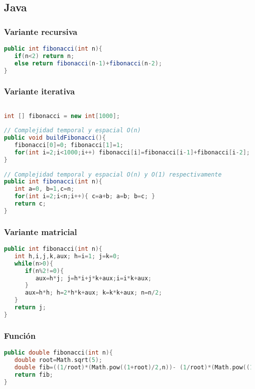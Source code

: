 \subsection{Java}

\subsubsection{Variante recursiva}

\begin{lstlisting}[language=Java]
public int fibonacci(int n){
   if(n<2) return n;
   else return fibonacci(n-1)+fibonacci(n-2);	
}
\end{lstlisting}

\subsubsection{Variante iterativa}

\begin{lstlisting}[language=Java]
	
int [] fibonacci = new int[1000];
	
// Complejidad temporal y espacial O(n)
public void buildFibonacci(){ 
   fibonacci[0]=0; fibonacci[1]=1;
   for(int i=2;i<1000;i++) fibonacci[i]=fibonacci[i-1]+fibonacci[i-2];	
}
	
// Complejidad temporal y espacial O(n) y O(1) respectivamente
public int fibonacci(int n){ 
   int a=0, b=1,c=n;
   for(int i=2;i<n;i++){ c=a+b; a=b; b=c; }
   return c;
}
\end{lstlisting}

\subsubsection{Variante matricial}

\begin{lstlisting}[language=C++]
public int fibonacci(int n){
   int h,i,j,k,aux; h=i=1; j=k=0;
   while(n>0){
      if(n%2!=0){
         aux=h*j; j=h*i+j*k+aux;i=i*k+aux; 
      }
      aux=h*h; h=2*h*k+aux; k=k*k+aux; n=n/2;
   }
   return j;
}
\end{lstlisting}

\subsubsection{Función}

\begin{lstlisting}[language=C++]
public double fibonacci(int n){
   double root=Math.sqrt(5);
   double fib=((1/root)*(Math.pow((1+root)/2,n))- (1/root)*(Math.pow((1-root)/2,n)));
   return fib;
}
\end{lstlisting}